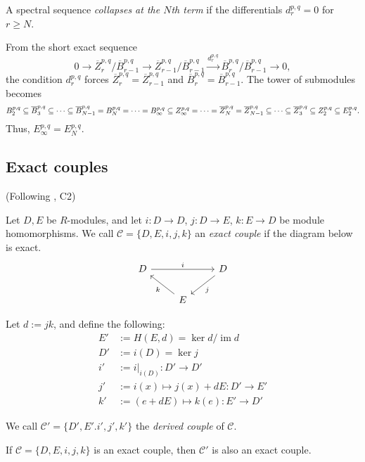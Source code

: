 \documentclass{MetricNotes2023}
\def\subq{\ensuremath\subseteq}
\DeclareMathOperator{\im}{im}
\begin{document}
\begin{definition}
A spectral sequence \textit{collapses at the \(N\)th term} if the differentials \(d_r^{p,q}=0\) for \(r\geq N\). 
\end{definition}

From the short exact sequence 
\[0 \to \overline Z^{p,q}_{r}/\overline B_{r-1}^{p,q}\to \overline Z_{r-1}^{p,q}/\overline B_{r-1}^{p,q} \xrightarrow{d_{r}^{p,q}} \overline B_{r}^{p,q}/\overline{B}_{r-1}^{p,q}\to 0,\]
the condition \(d_r^{p,q}\) forces  \(\overline{Z}^{p,q}_r=\overline{Z}_{r-1}^{p,q}\) and \(\overline{B}^{p,q}_r=\overline{B}_{r-1}^{p,q}\). The tower of submodules becomes
\[B_2^{p,q}\subq \overline B_3^{p,q}\subq \cdots \subq \overline B_{N-1}^{p,q}=B_N^{p,q}= \cdots=B_\infty^{p,q} \subq Z_\infty^{p,q}= \cdots = \overline Z_N^{p,q}=\overline Z^{p,q}_{N-1}\subq \cdots \subq \overline Z_3^{p,q}\subq Z_2^{p,q}\subq E_2^{p,q}.\]
Thus, \(E_\infty^{p,q}=E_N^{p,q}\). 

\subsection{Exact couples}

(Following \autocite{spectral_sequences}, C2)

\begin{definition}
Let \(D, E\) be \(R\)-modules, and let \(i : D \to D\), \(j : D\to E\), \(k : E \to D\) be module homomorphisms. We call \(\mathcal{C}=\{D, E, i, j, k\}\) an \textit{exact couple} if the diagram below is exact.
\[\begin{tikzcd}
 D \arrow[rr, "i"] && D \arrow[dl, "j"] \\ 
  & E \arrow[ul, "k"] &  
 \end{tikzcd}\] 
\end{definition}

Let \(d:=jk\), and define the following:
\begin{align*}
E'&:=H(E, d)=\ker d/\im d\\
D'&:=i(D)=\ker j\\
i'&:=i|_{i(D)} : D'\to D'\\
j'&:=i(x)\mapsto j(x)+dE : D'\to E'\\
k'&:=(e+dE)\mapsto k(e) : E' \to D'
\end{align*}

We call \(\mathcal{C}'=\{D', E'. i', j', k'\}\) the \textit{derived couple} of \(\mathcal{C}\). 

\begin{proposition}
If \(\mathcal{C}=\{D, E, i, j, k\}\) is an exact couple, then \(\mathcal{C}'\) is also an exact couple.
\end{proposition}
\end{document}
